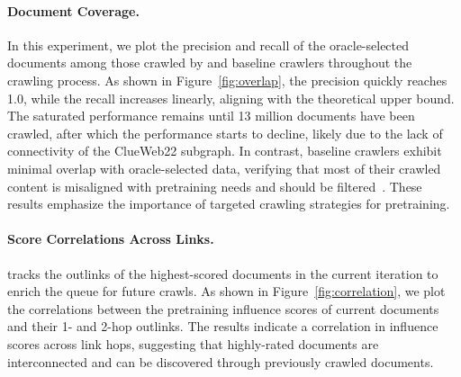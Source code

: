 \paragraph{Document Coverage.}



In this experiment, we plot the precision and recall of the oracle-selected documents among those crawled by \ours{} and baseline crawlers throughout the crawling process.
As shown in Figure~\ref{fig:overlap}, the precision quickly reaches 1.0, while the recall increases linearly, aligning with the theoretical upper bound.
The saturated performance remains until 13 million documents have been crawled, after which the performance starts to decline, likely due to the lack of connectivity of the ClueWeb22 subgraph.
In contrast, baseline crawlers exhibit minimal overlap with oracle-selected data, verifying that most of their crawled content is misaligned with pretraining needs and should be filtered~\citep{dclm,fineweb}. 
These results emphasize the importance of targeted crawling strategies for pretraining.

\paragraph{Score Correlations Across Links.}



\ours{} tracks the outlinks of the highest-scored documents in the current iteration to enrich the queue for future crawls.
As shown in Figure~\ref{fig:correlation}, we plot the correlations between the pretraining influence scores of current documents and their 1- and 2-hop outlinks.
The results indicate a correlation in influence scores across link hops, suggesting that highly-rated documents are interconnected and can be discovered through previously crawled documents.



